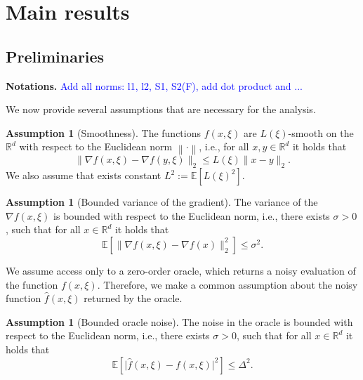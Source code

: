 \documentclass{article}
\theoremstyle{plain}
\theoremstyle{definition}
\newtheorem{assumption}[theorem]{Assumption}
\theoremstyle{remark}
\newcommand{\expect}[1]{\mathbb{E}\left[ #1 \right]}
\newcommand{\norm}[1]{\left\| #1 \right\|}
\begin{document}


\section{Main results} \label{sec:main}

\subsection{Preliminaries} \label{subsec:prelim}

\textbf{Notations.} \textcolor{blue}{Add all norms: l1, l2, S1, S2(F), add dot product and ...}

We now provide several assumptions that are necessary for the analysis.
\begin{assumption}[Smoothness]\label{as:lip}
    The functions $f(x, \xi)$ are $L(\xi)$-smooth on the $\mathbb{R}^d$ with respect to the Euclidean norm $\norm{\cdot}$, i.e., for all $x, y \in \mathbb{R}^d$ it holds that
    $$
        \|\nabla f(x, \xi) - \nabla f(y, \xi)\|_2 \leq L(\xi) \|x-y\|_2.
    $$
    We also assume that exists constant $L^2 := \expect{L(\xi)^2}$.
\end{assumption}
\begin{assumption}[Bounded variance of the gradient] \label{as:sigma}
    The variance of the $\nabla f(x, \xi)$ is bounded with respect to the Euclidean norm, i.e., there exists $\sigma > 0$, such that for all $x \in \mathbb{R}^d$ it holds that
    $$
        \expect{\|\nabla f(x, \xi) - \nabla f(x)\|_2^2} \leq \sigma^2.
    $$
\end{assumption}
We assume access only to a zero-order oracle, which returns a noisy evaluation of the function $f(x, \xi)$. Therefore, we make a common assumption about the noisy function $\hat{f}(x, \xi)$ returned by the oracle.
\begin{assumption}[Bounded oracle noise]\label{as:delta}
    The noise in the oracle is bounded with respect to the Euclidean norm, i.e., there exists $\sigma > 0$, such that for all $x \in \mathbb{R}^d$ it holds that
    $$
        \expect{\big|\hat{f}(x, \xi) - f(x, \xi)\big|^2} \leq \Delta^2 .
    $$
\end{assumption}
\end{document}
